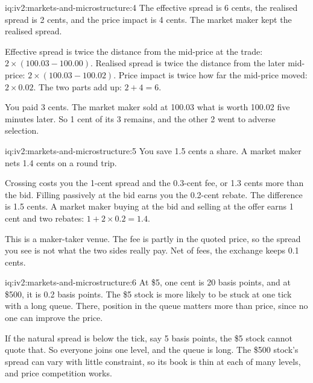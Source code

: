\begin{solution}{iq:iv2:markets-and-microstructure:4}
The effective spread is 6 cents, the realised spread is 2 cents, and the price impact is 4 cents. The market maker kept the realised spread.

Effective spread is twice the distance from the mid-price at the trade: $2 \times (100.03 - 100.00)$. Realised spread is twice the distance from the later mid-price: $2 \times (100.03 - 100.02)$. Price impact is twice how far the mid-price moved: $2 \times 0.02$. The two parts add up: $2 + 4 = 6$.

You paid 3 cents. The market maker sold at 100.03 what is worth 100.02 five minutes later. So 1 cent of its 3 remains, and the other 2 went to adverse selection.

\end{solution}

\begin{solution}{iq:iv2:markets-and-microstructure:5}
You save 1.5 cents a share. A market maker nets 1.4 cents on a round trip.

Crossing costs you the 1-cent spread and the 0.3-cent fee, or 1.3 cents more than the bid. Filling passively at the bid earns you the 0.2-cent rebate. The difference is 1.5 cents. A market maker buying at the bid and selling at the offer earns 1 cent and two rebates: $1 + 2 \times 0.2 = 1.4$.

This is a maker-taker venue. The fee is partly in the quoted price, so the spread you see is not what the two sides really pay. Net of fees, the exchange keeps 0.1 cents.

\end{solution}

\begin{solution}{iq:iv2:markets-and-microstructure:6}
At \$5, one cent is 20 basis points, and at \$500, it is 0.2 basis points. The \$5 stock is more likely to be stuck at one tick with a long queue. There, position in the queue matters more than price, since no one can improve the price.

If the natural spread is below the tick, say 5 basis points, the \$5 stock cannot quote that. So everyone joins one level, and the queue is long. The \$500 stock's spread can vary with little constraint, so its book is thin at each of many levels, and price competition works.

\end{solution}

